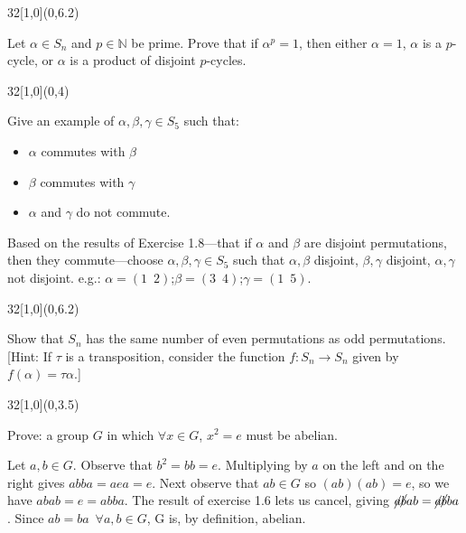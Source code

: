 \documentclass[12pt]{article}
\newenvironment{exercise}[2]{\begin{textblock}{32}[1,0](0,#2)\noindent#1\end{textblock}}{\vspace{1in}}
\begin{document}
\begin{exercise}{1.16}{6.2}
	{\noindent}Let $\alpha\in S_n$ and $p\in \mathbb{N}$ be prime. Prove that if $\alpha^p=1$,
	then either $\alpha=1$, $\alpha$ is a $p$-cycle, or $\alpha$ is a product of disjoint $p$-cycles.
	\bigskip

\end{exercise}

\begin{exercise}{1.18}{4}
	{\noindent}Give an example of $\alpha, \beta, \gamma\in S_5$ such that:
	\begin{itemize}
		\item $\alpha$ commutes with $\beta$
		\item $\beta$ commutes with $\gamma$
		\item $\alpha$ and $\gamma$ do not commute.
	\end{itemize}
	\bigskip
	Based on the results of Exercise 1.8---that if $\alpha$ and $\beta$ are disjoint permutations,
	then they commute---choose $\alpha, \beta, \gamma\in S_5$ such that $\alpha, \beta$ disjoint,
	$\beta, \gamma$ disjoint, $\alpha, \gamma$ not disjoint. e.g.:
	$\alpha = (1\enspace2)$;\quad $\beta = (3\enspace4)$;\quad $\gamma = (1\enspace5)$.
\end{exercise}

\begin{exercise}{1.21}{6.2}
  {\noindent}Show that $S_n$ has the same number of even permutations as odd permutations.
	[Hint: If $\tau$ is a transposition, consider the function $f : S_n\to S_n$ given by $f(\alpha)=\tau\alpha$.]
	\bigskip

\end{exercise}


\begin{exercise}{1.26}{3.5}
	{\noindent}Prove: a group $G$ in which $\forall x\in G$, $x^2=e$ must be abelian.
	\bigskip

	{\noindent}Let $a, b\in G$. Observe that $b^2 = bb = e$. Multiplying by $a$ on the left and on the right gives
	$abba = aea = e$. Next observe that $ab\in G$ so $(ab)(ab) = e$, so we have $abab = e = abba$. The result of
	exercise 1.6 lets us cancel, giving $\cancel{a}\cancel{b}ab = \cancel{a}\cancel{b}ba$. Since $ab = ba\enspace
	\forall a, b \in G$, G is, by definition, abelian.
\end{exercise}
\end{document}
